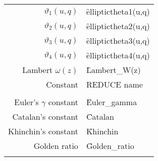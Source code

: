 {\begin{tabular}{r l}
$\vartheta_1(u,q)$ & \f{elliptictheta1(u,q)}\\
$\vartheta_2(u,q)$ & \f{elliptictheta2(u,q)}\\
$\vartheta_3(u,q)$ & \f{elliptictheta3(u,q)}\\
$\vartheta_4(u,q)$ & \f{elliptictheta4(u,q)}\\
Lambert $\omega(z)$ & \f{Lambert\_W(z)} \\[12pt]
Constant & REDUCE name \\\\
Euler's $\gamma$ constant & \f{Euler\_gamma}\\
Catalan's constant & \f{Catalan}\\
Khinchin's constant & \f{Khinchin}\\
Golden ratio & \f{Golden\_ratio}\\
\mbox{}
\end{tabular}}
\newpage
